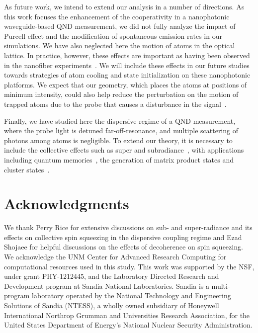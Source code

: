 \documentclass[preprint,aps,pra,onecolumn,superscriptaddress]{revtex4-1} %
\begin{document}
As future work, we intend to extend our analysis in a number of directions.  As this work focuses the enhancement of the cooperativity in a nanophotonic waveguide-based QND measurement, we did not fully analyze the impact of Purcell effect and the modification of spontaneous emission rates in our simulations.  We have also neglected here the motion of atoms in the optical lattice. In practice, however, these effects are important as having been observed in the nanofiber  experiments~\cite{Solano2017Dynamics, Solano2017Alignment, Beguin2017Observation, Solano2017Optical}.  We will include these effects in our future studies towards strategies of atom cooling and state initialization on these nanophotonic platforms. We expect that our geometry, which places the atoms at positions of minimum intensity, could also help reduce the perturbation on the motion of trapped atoms due to the probe that causes a disturbance in the signal~\cite{Solano2017Dynamics}.  

Finally, we have studied here the dispersive regime of a QND measurement, where the probe light is detuned far-off-resonance, and multiple scattering  of photons among atoms is negligible. To extend our theory, it is necessary to include the collective effects such as super and subradiance~\cite{Asenjo-Garcia2017Exponential, Asenjo-Garcia2017Atom, Solano2017Super}, with applications including quantum memories~\cite{Sayrin2015, Gouraud2015Demonstration},  the generation of matrix product states and cluster states~\cite{Economou2010, Lodahl2017Chiral, Schwartz2016Deterministic, Pichler2016Photonic, Pichler2017Photonic}.  


\section{Acknowledgments}
We thank Perry Rice for extensive discussions on sub- and super-radiance and its effects on collective spin squeezing in the dispersive coupling regime and Ezad Shojaee for helpful discussions on the effects of decoherence on spin squeezing. We  acknowledge the UNM Center for Advanced Research Computing for computational resources used in this study.
This work was supported by the NSF, under grant PHY-1212445, and the Laboratory Directed Research and Development program at Sandia National Laboratories. Sandia is a multi-program laboratory operated by the National Technology and Engineering Solutions of Sandia (NTESS), a wholly owned subsidiary of Honeywell International Northrop Grumman and Universities Research Association, for the United States Department of Energy’s National Nuclear Security Administration.
\end{document}
